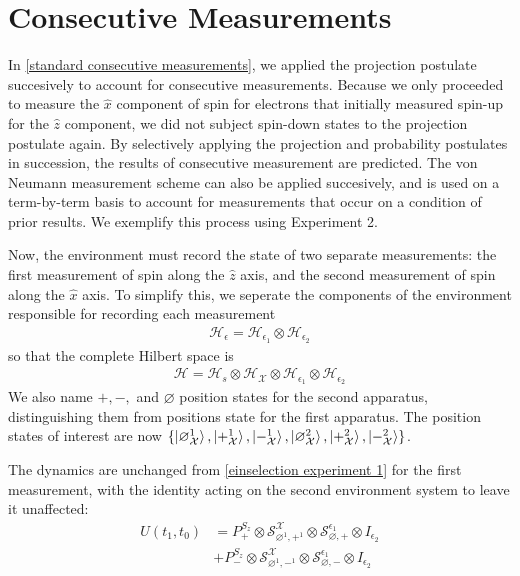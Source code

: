 \section{Consecutive Measurements}

In \autoref{standard consecutive measurements}, we applied the projection postulate succesively to account for consecutive measurements. Because we only proceeded to measure the $\hat{x}$ component of spin for electrons that initially measured spin-up for the $\hat{z}$ component, we did not subject spin-down states to the projection postulate again. By selectively applying the projection and probability postulates in succession, the results of consecutive measurement are predicted. The von Neumann measurement scheme can also be applied succesively, and is used on a term-by-term basis to account for measurements that occur on a condition of prior results. We exemplify this process using Experiment 2.

Now, the environment must record the state of two separate measurements: the first measurement of spin along the $\hat{z}$ axis, and the second measurement of spin along the $\hat{x}$ axis. To simplify this, we seperate the components of the environment responsible for recording each measurement
\begin{align}
  \mathcal{H}_\epsilon = \mathcal{H}_{\epsilon_1} \otimes \mathcal{H}_{\epsilon_2}
\end{align}
so that the complete Hilbert space is
\begin{align}
  \mathcal{H} = \mathcal{H}_s \otimes \mathcal{H}_\mathcal{X} \otimes \mathcal{H}_{\epsilon_1} \otimes \mathcal{H}_{\epsilon_2}
\end{align}
We also name $+, -,$ and $\varnothing$ position states for the second apparatus, distinguishing them from positions state for the first apparatus. The position states of interest are now $\{ \ket{\varnothing_{\mathcal{X}}^1}, \ket{+_{\mathcal{X}}^1}, \ket{-_{\mathcal{X}}^1}, \ket{\varnothing_{\mathcal{X}}^2}, \ket{+_{\mathcal{X}}^2}, \ket{-_{\mathcal{X}}^2} \}$.

The dynamics are unchanged from \autoref{einselection experiment 1} for the first measurement, with the identity acting on the second environment system to leave it unaffected:
\begin{align}
  U(t_1, t_0) &= P^{S_z}_+ \otimes \mathcal{S}^{\mathcal{X}}_{\varnothing^1, +^1}  \nonumber \otimes \mathcal{S}^{\epsilon_1}_{ \varnothing, +} \otimes I_{\epsilon_2}\\ \nonumber
  &+ P^{S_z}_- \otimes \mathcal{S}^{\mathcal{X}}_{\varnothing^1, -^1} \otimes \mathcal{S}^{\epsilon_1}_{\varnothing, -} \otimes I_{\epsilon_2}
\end{align}

